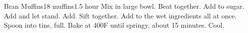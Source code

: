 \documentclass[../Cookbook.tex]{subfiles}
\begin{document}
\begin{recipe}[BranMuffins]{Bran Muffins}{18 muffins}{1.5 hour}
Mix in large bowl.
Beat together. Add to sugar.
Add and let stand.
Add.
Sift together. Add to the wet ingredients all at once.
Spoon into tins,  full.
Bake at 400\0F until springy, about 15 minutes. Cool.
\end{recipe}
\end{document}
